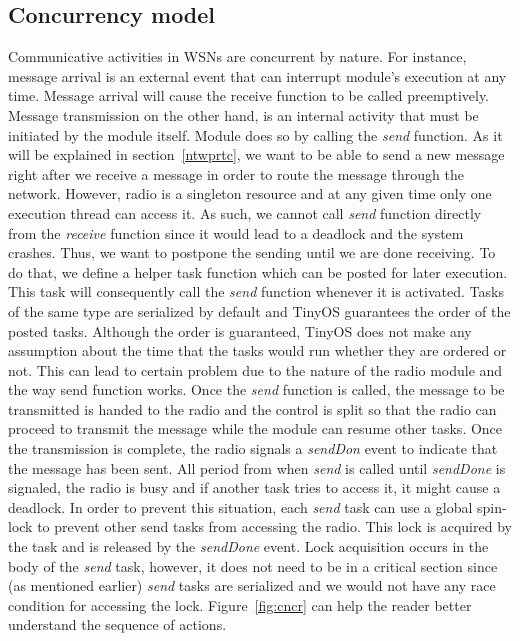 \documentclass[11pt, titlepage, oneside]{article}
\begin{document}
\subsection{Concurrency model} \label{cncrmdl}
Communicative activities in WSNs are concurrent by nature. For instance, message arrival is an external event that can interrupt module's execution at any time. Message arrival will cause the receive function to be called preemptively. Message transmission on the other hand, is an internal activity that must be initiated by the module itself. Module does so by calling the {\it send} function. As it will be explained in section~\ref{ntwprtc}, we want to be able to send a new message right after we receive a message in order to route the message through the network. However, radio is a singleton resource and at any given time only one execution thread can access it.  As such, we cannot call {\it send} function directly from the {\it receive} function since it would lead to a deadlock and the system crashes. Thus, we want to postpone the sending until we are done receiving. To do that, we define a helper task function which can be posted for later execution. This task will consequently call the {\it send} function whenever it is activated.  Tasks of the same type are serialized by default and TinyOS guarantees the order of the posted tasks. Although the order is guaranteed, TinyOS does not make any assumption about the time that the tasks would run whether they are ordered or not. This can lead to certain problem due to the nature of the radio module and the way send function works. Once the {\it send} function is called, the message to be transmitted is handed to the radio and the control is split so that the radio can proceed to  transmit the message while the module can resume other tasks. Once the transmission is complete, the radio signals a {\it sendDon} event to indicate that the message has been sent. All period from when {\it send} is called until {\it sendDone} is signaled, the radio is busy and if another task tries to access it, it might cause a deadlock. In order to prevent this situation, each {\it send} task can use a global spin-lock to prevent other send tasks from accessing the radio. This lock is acquired by the task and is released by the {\it sendDone} event. Lock acquisition occurs in the body of the {\it send} task, however, it does not need to be in a critical section since (as mentioned earlier) {\it send} tasks are serialized and we would not have any race condition for accessing the lock. Figure~\ref{fig:cncr} can help the reader better understand the sequence of actions.  
 
\end{document}
